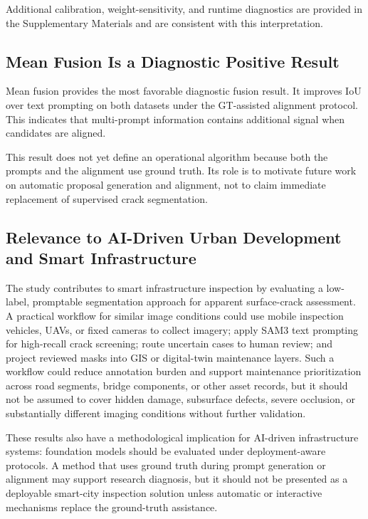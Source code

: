 \documentclass[applsci,article,submit,pdftex,moreauthors]{Definitions/mdpi}
\begin{document}
Additional calibration, weight-sensitivity, and runtime diagnostics are
provided in the Supplementary Materials and are consistent with this
interpretation.

\subsection{Mean Fusion Is a Diagnostic Positive Result}

Mean fusion provides the most favorable diagnostic fusion result. It
improves IoU over text prompting on both datasets under the GT-assisted
alignment protocol. This indicates that multi-prompt information
contains additional signal when candidates are aligned.

This result does not yet define an operational algorithm because both
the prompts and the alignment use ground truth. Its role is to motivate
future work on automatic proposal generation and alignment, not to claim
immediate replacement of supervised crack segmentation.

\subsection{Relevance to AI-Driven Urban Development and Smart Infrastructure}

The study contributes to smart infrastructure inspection by evaluating a
low-label, promptable segmentation approach for apparent surface-crack
assessment. A practical workflow for similar image conditions could use
mobile inspection vehicles, UAVs, or fixed cameras to collect imagery;
apply SAM3 text prompting for high-recall crack screening; route
uncertain cases to human review; and project reviewed masks into GIS or
digital-twin maintenance layers. Such a workflow could reduce annotation
burden and support maintenance prioritization across road segments,
bridge components, or other asset records, but it should not be assumed
to cover hidden damage, subsurface defects, severe occlusion, or
substantially different imaging conditions without further validation.

These results also have a methodological implication for AI-driven
infrastructure systems: foundation models should be evaluated under
deployment-aware protocols. A method that uses ground truth during
prompt generation or alignment may support research diagnosis, but it
should not be presented as a deployable smart-city inspection solution
unless automatic or interactive mechanisms replace the ground-truth
assistance.
\end{document}

